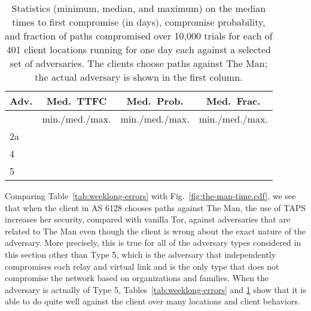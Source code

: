 \documentclass[conference]{styles/IEEEtran}
\newcommand{\ps}{TAPS\xspace}
\begin{document}
\begin{table}
\begin{center}
\begin{tabular}{|l|c|c|c|c|c|c|c|c|c|}\hline
Adv. & \multicolumn{3}{|c|}{Med.\ TTFC} & \multicolumn{3}{|c|}{Med.\ Prob.} & \multicolumn{3}{|c|}{Med.\ Frac.} \\ \hline
& \multicolumn{3}{|c|}{min./med./max.} & \multicolumn{3}{|c|}{min./med./max.} & \multicolumn{3}{|c|}{min./med./max.} \\ \hline
2a &  &  &  &  &  &  &  &  &    \\ \hline
4 &  &  &  &  &  &  &  &  &    \\ \hline
5 &  &  &  &  &  &  &  &  &    \\ \hline
\end{tabular}
\end{center}
\vspace{-2mm}
\caption{\small Statistics (minimum, median, and maximum) on the median times to first compromise (in days), compromise probability, and fraction of paths compromised over 10,000 trials for each of 401 client locations running for one day each against a selected set of adversaries.  The clients choose paths against \textsf{The Man}; the actual adversary is shown in the first column.}\label{tab:day-errors}
\vspace{-4mm}
\end{table}

Comparing Table~\ref{tab:weeklong-errors} with Fig.~\ref{fig:the-man-time.cdf}, we see that when the
client in AS 6128 chooses paths against \textsf{The Man}, the use of \ps increases her security,
compared with vanilla Tor, against adversaries that are related to \textsf{The Man} even though the
client is wrong about the exact nature of the adversary. More precisely, this is true for all of
the adversary types considered in this section other than Type 5, which is the adversary that
independently compromises each relay and virtual link and is the only type that does not
compromise the network based on organizations and families. When the adversary is actually of Type
5, Tables~\ref{tab:weeklong-errors} and \ref{tab:day-errors} show that it is able to do quite well
against the client over many locations and client behaviors.
\end{document}
